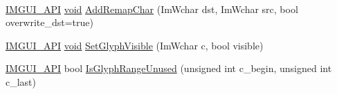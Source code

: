 \begin{DoxyCompactItemize}
$$\item 
\hyperlink{imgui_8h_a43829975e84e45d1149597467a14bbf5}{I\+M\+G\+U\+I\+\_\+\+A\+PI} \hyperlink{imgui__impl__opengl3__loader_8h_ac668e7cffd9e2e9cfee428b9b2f34fa7}{void} \hyperlink{structImFont_aba8cd20f14ba47175d45d3f2063aa329}{Add\+Remap\+Char} (Im\+Wchar dst, Im\+Wchar src, bool overwrite\+\_\+dst=true)
\item 
\hyperlink{imgui_8h_a43829975e84e45d1149597467a14bbf5}{I\+M\+G\+U\+I\+\_\+\+A\+PI} \hyperlink{imgui__impl__opengl3__loader_8h_ac668e7cffd9e2e9cfee428b9b2f34fa7}{void} \hyperlink{structImFont_a52fbd5caef22c68bb8e0e251c6bfcc53}{Set\+Glyph\+Visible} (Im\+Wchar c, bool visible)
\item 
\hyperlink{imgui_8h_a43829975e84e45d1149597467a14bbf5}{I\+M\+G\+U\+I\+\_\+\+A\+PI} bool \hyperlink{structImFont_a4374ffca4f2d9a23599aac21c57e2a66}{Is\+Glyph\+Range\+Unused} (unsigned int c\+\_\+begin, unsigned int c\+\_\+last)
\end{DoxyCompactItemize}
